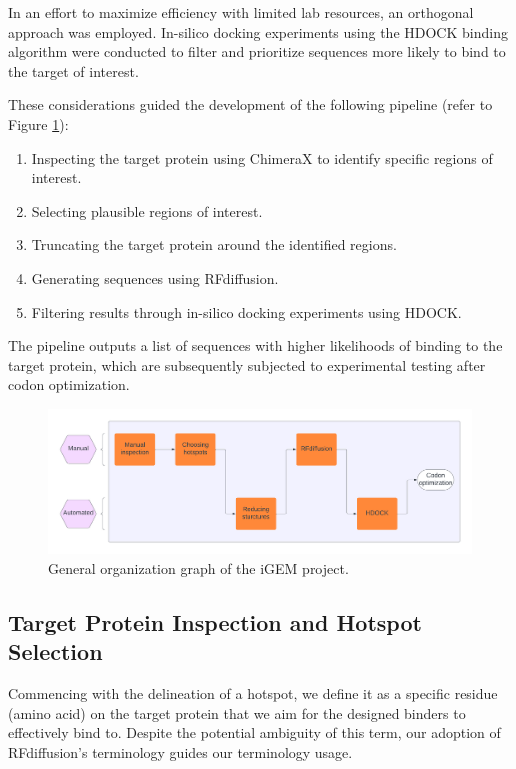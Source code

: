 \documentclass[11pt,a4paper]{article}
\begin{document}
In an effort to maximize efficiency with limited lab resources, an 
orthogonal approach was employed. In-silico docking experiments using 
the HDOCK binding algorithm were conducted to filter and prioritize 
sequences more likely to bind to the target of interest.

These considerations guided the development of the following pipeline 
(refer to Figure \ref{fig:organization_graph}):

\begin{enumerate}
    \item Inspecting the target protein using ChimeraX to identify 
    specific regions of interest.
    \item Selecting plausible regions of interest.
    \item Truncating the target protein around the identified regions.
    \item Generating sequences using RFdiffusion.
    \item Filtering results through in-silico docking experiments using 
    HDOCK.
\end{enumerate}

The pipeline outputs a list of sequences with higher likelihoods of binding to the target protein, which are subsequently subjected to experimental testing after codon optimization.

\begin{figure}[ht]
    \centering
    \label{fig:organization_graph}
    \includegraphics[width=\textwidth]{Figures/iGEM_project_general_organization_graph.pdf}
    \caption{General organization graph of the iGEM project.}
\end{figure}

\subsection{Target Protein Inspection and Hotspot Selection}

Commencing with the delineation of a hotspot, we define it as a specific residue (amino acid) on the target protein that we aim for the designed binders to effectively bind to. Despite the potential ambiguity of this term, our adoption of RFdiffusion's terminology guides our terminology usage.
\end{document}
